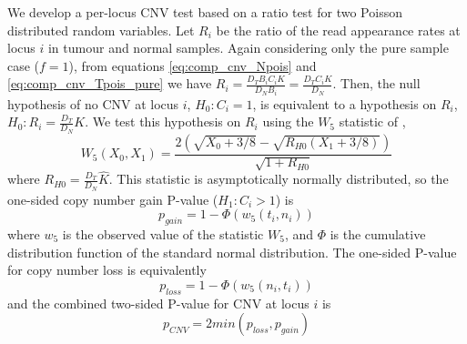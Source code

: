 \documentclass[thesis.tex]{subfiles}
\begin{document}

We develop a per-locus \gls{CNV} test based on a ratio test for two Poisson distributed random variables.  Let $R_i$ be the ratio of the read appearance rates at locus $i$ in tumour and normal samples.  Again considering only the pure sample case ($f = 1$), from equations \ref{eq:comp_cnv_Npois} and \ref{eq:comp_cnv_Tpois_pure} we have $R_i = \frac{D_T B_i C_i K}{D_N B_i} = \frac{D_T C_i K}{D_N}$.  Then, the null hypothesis of no \gls{CNV} at locus $i$, $H_0: C_i = 1$, is equivalent to a hypothesis on $R_i$, $H_0: R_i = \frac{D_T}{D_N}K$.  We test this hypothesis on $R_i$ using the $W_5$ statistic of \cite{Gu2008},
\begin{equation}
  W_5(X_0, X_1) = \frac{2\left(\sqrt{X_0 + 3/8} - \sqrt{R_{H0}\left(X_1 + 3/8\right)}\right)}{\sqrt{1 + R_{H0}}}
\end{equation}
where $R_{H0} = \frac{D_T}{D_N}\hat{K}$.  This statistic is asymptotically normally distributed, so the one-sided copy number gain P-value ($H_1: C_i > 1$) is
\begin{equation}
  p_{gain} = 1 - \Phi\left(w_5(t_i, n_i)\right)
\end{equation}
where $w_5$ is the observed value of the statistic $W_5$, and $\Phi$ is the cumulative distribution function of the standard normal distribution.  The one-sided P-value for copy number loss is equivalently
\begin{equation}
  p_{loss} = 1 - \Phi\left(w_5(n_i, t_i)\right)
\end{equation}
and the combined two-sided P-value for \gls{CNV} at locus $i$ is
\begin{equation}
  p_{CNV} = 2 min(p_{loss}, p_{gain})
\end{equation}
\end{document}
